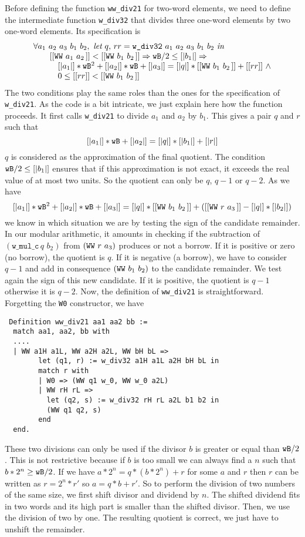 Before defining the function {\tt ww\_div21} for two-word elements,
we need to define the intermediate function  {\tt w\_div32}
that divides three one-word elements by two one-word elements.
Its specification is
$$\begin{array}{l}
\forall a_1\,\, a_2\,\, a_3\,\, b_1\,\, b_2, \,\, \textit{let}\,\, q,\, rr = 
\texttt{w\_div32}\,\, a_1\,\, a_2\,\, a_3\,\, b_1\,\, b_2\,\, \textit{in}\\
 \hskip20pt [[\texttt{WW}\,\,a_1\,\,a_2\,]] < [[\texttt{WW}\,\,b_1\,\,b_2\,]] \Rightarrow 
 {\texttt{wB}} / 2 \le [|b_1|] \Rightarrow\\
 \hskip30pt [|a_1|] * {\texttt{wB}} ^ 2 + [|a_2|] * {\texttt{wB}}  + [|a_3|] =   [|q|] *  
 [[\texttt{WW}\,\,b_1\,\,b_2\,]] + [[rr]] \,\,\land  \\
 \hskip30pt 0 \le [[rr]] < [[\texttt{WW}\,\,b_1\,\,b_2\,]]
\end{array}
$$
The two conditions play the same roles than the ones for the specification of {\tt w\_div21}.
As the code is a bit intricate, we just explain here how the function
proceeds. It first calls {\tt w\_div21} to divide $a_1$ and $a_2$
by $b_1$. This gives a pair $q$ and $r$ such that
$$[|a_1|] * {\texttt{wB}} + [|a_2|] = [|q|] * [|b_1|] + [|r|]$$
$q$ is considered as the approximation of the final quotient.
The condition ${\texttt{wB}} / 2 \le [|b_1|]$ ensures that if this approximation
is not exact, it exceeds the real value of at most two units. So the quotient 
can only be $q$, $q - 1$ or $q - 2$. 
As we have 
$$[|a_1|] *  {\texttt{wB}} ^ 2  + [|a_2|] * {\texttt{wB}} + [|a_3|] = [|q|] * [[\texttt{WW}\,\,b_1\,\,b_2\,]] + ([[\texttt{WW}\,\,r\,\,a_3\,]] - [|q|] * [|b_2|])$$
we know in which situation we are by testing the sign of the candidate
remainder.
In our modular arithmetic, it amounts in checking if the subtraction of
$(\texttt{w\_mul\_c}\, q\,\, b_2)$ from $(\texttt{WW}\,\,r\,\,a_3\,\!)$
produces or not a borrow.  
If it is positive or zero (no borrow), the quotient is $q$. 
If it is negative (a borrow), 
we have to consider $q - 1$ and add in consequence $(\texttt{WW}\,\,b_1\,\,b_2\,\!)$ 
to the candidate remainder.
We test again the sign of this new candidate. 
If it is positive, the quotient is $q - 1$
otherwise it is $q - 2$.
Now, the definition of {\tt ww\_div21} is straightforward. 
Forgetting the {\tt W0}
constructor, we have
\begin{verbatim} 
 Definition ww_div21 aa1 aa2 bb :=
  match aa1, aa2, bb with
  ....  
  | WW a1H a1L, WW a2H a2L, WW bH bL =>
        let (q1, r) := w_div32 a1H a1L a2H bH bL in
        match r with
        | W0 => (WW q1 w_0, WW w_0 a2L)
        | WW rH rL =>
          let (q2, s) := w_div32 rH rL a2L b1 b2 in
          (WW q1 q2, s)
        end
  end.
\end{verbatim}
These two divisions can only be used if the divisor $b$ is greater or equal
than ${\texttt{wB}}/2$.
This is not restrictive
because if $b$ is too small we can always find a $n$ such that 
$b* 2 ^n \ge {\texttt{wB}}/2$. If we have $a * 2 ^ n  =  q  * (b * 2 ^ n) + r$ 
for some $a$ and $r$ then $r$ can be written as $r = 2^n * r'$ so
$a = q * b + r'$. So to perform the division of two numbers of the same size, 
we first shift divisor and dividend by $n$. 
The shifted dividend fits in two words and its high part is smaller
than the shifted divisor. Then, we use the division of two by one. 
The resulting quotient is correct, we just have to unshift the remainder.


